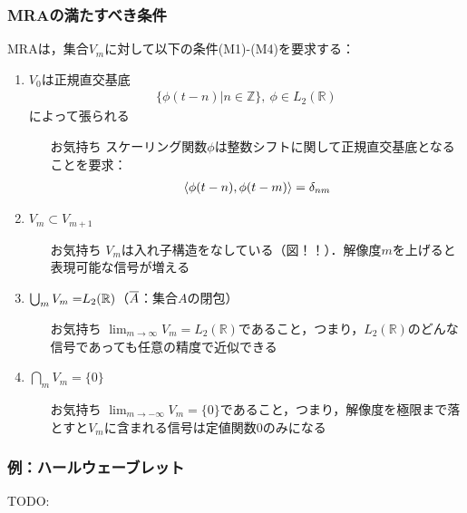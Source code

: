 \documentclass[dvipdfmx,graphicx,14pt]{beamer}
\newcommand{\roverline}[1]{\mathpalette\doroverline{#1}}
\newcommand{\doroverline}[2]{\overline{#1#2}}
\begin{document}
\begin{frame}[c, allowframebreaks]
    \frametitle{MRAの満たすべき条件}
    MRAは，集合$V_{m}$に対して以下の条件(M1)-(M4)を要求する：
    \begin{enumerate}[(M1)]
        \item \label{itm:mra1} $V_{0}$は正規直交基底
            \begin{align*}
                \{ \phi(t - n) | n \in \mathbb{Z} \},\ \phi \in L_{2}(\mathbb{R})
            \end{align*}
            によって張られる
            \begin{itemize}
                \item[お気持ち] スケーリング関数$\phi$は整数シフトに関して正規直交基底となることを要求：
                    \begin{align*}
                        \langle \phi(t - n), \phi(t - m) \rangle = \delta_{nm}
                    \end{align*}
            \end{itemize}
            \newpage
        \item \label{itm:mra2} $V_{m} \subset V_{m+1}$
            \begin{itemize}
                \item[お気持ち] $V_{m}$は入れ子構造をなしている（図！！）．解像度$m$を上げると表現可能な信号が増える
            \end{itemize}
            \newpage
        \item \label{itm:mra3} $\roverline{\bigcup_{m} V_{m}} = L_{2}(\mathbb{R})$（$\roverline{A}$：集合$A$の閉包）
            \begin{itemize}
                \item[お気持ち] $\displaystyle\lim_{m \to \infty} V_{m} = L_{2}(\mathbb{R})$であること，つまり，$L_{2}(\mathbb{R})$のどんな信号であっても任意の精度で近似できる
            \end{itemize}
        \item $\bigcap_{m} V_{m} = \{ 0 \}$
            \begin{itemize}
                \item[お気持ち] $\displaystyle\lim_{m \to -\infty} V_{m} = \{ 0 \}$であること，つまり，解像度を極限まで落とすと$V_{m}$に含まれる信号は定値関数$0$のみになる
            \end{itemize}
    \end{enumerate}
\end{frame}

\begin{frame}[c]
    \frametitle{例：ハールウェーブレット}
    TODO:
\end{frame}
\end{document}
